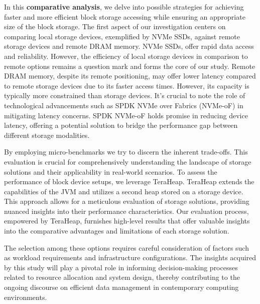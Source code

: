 \par In this \textbf{comparative analysis}, we delve into possible strategies for
achieving faster and more efficient block storage accessing while ensuring an
appropriate size of the block storage. The first aspect of our investigation
centers on comparing local storage devices, exemplified by NVMe SSDs, against
remote storage devices and remote DRAM memory. NVMe SSDs, offer rapid data
access and reliability. However, the efficiency of local storage devices in
comparison to remote options remains a question mark and forms the core of our
study. Remote DRAM memory, despite its remote positioning, may offer lower
latency compared to remote storage devices due to its faster access times.
However, its capacity is typically more constrained than storage devices. It's
crucial to note the role of technological advancements such as SPDK NVMe over
Fabrics (NVMe-oF) in mitigating latency concerns. SPDK NVMe-oF holds promise in
reducing device latency, offering a potential solution to bridge the performance
gap between different storage modalities. 

 \par By employing micro-benchmarks we try to discern the inherent trade-offs. This
evaluation is crucial for comprehensively understanding the landscape of storage
solutions and their applicability in real-world scenarios. To assess the
performance of block device setups, we leverage TeraHeap. TeraHeap extends the
capabilities of the JVM and utilizes a second heap stored on a storage device.
This approach allows for a meticulous evaluation of storage solutions, providing
nuanced insights into their performance characteristics. Our evaluation process,
empowered by TeraHeap, furnishes high-level results that offer valuable insights
into the comparative advantages and limitations of each storage solution.

\par The selection among these options requires careful consideration of factors such
as workload requirements and infrastructure configurations. The insights
acquired by this study will play a pivotal role in informing decision-making
processes related to resource allocation and system design, thereby contributing
to the ongoing discourse on efficient data management in contemporary computing
environments.

